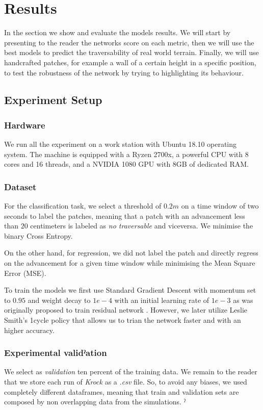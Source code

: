 \documentclass[../document.tex]{subfiles}
\begin{document}
\section{Results}
In the section we show and evaluate the models results. We will start by presenting to the reader the networks score on each metric, then we will use the best models to predict the traversability of real world terrain. Finally, we will use handcrafted patches, for example a wall of a certain height in a specific position, to test the robustness of the network by trying to highlighting its behaviour.
\subsection{Experiment Setup}
\subsubsection{Hardware}
We run all the experiment on a work station with Ubuntu 18.10 operating system. The machine is equipped with a Ryzen 2700x, a powerful CPU with 8 cores and 16 threads, and a NVIDIA 1080 GPU with 8GB of dedicated RAM.
\subsubsection{Dataset}
For the classification task, we select a threshold of $0.2m$ on a time window of two seconds to label the patches, meaning that a patch with an advancement less than $20$ centimeters is labeled as \emph{no traversable} and viceversa. We minimise the binary Cross Entropy. 

On the other hand, for regression, we did not label the patch and directly regress on the advancement for a given time window while minimising the Mean Square Error (MSE). 

To train the models we first use Standard Gradient Descent with momentum set to $0.95$ and weight decay to $1e-4$ with an initial learning rate of $1e-3$ as was originally proposed to train residual network \cite{he2015deep}. However, we later utilize Leslie Smith's 1cycle policy \cite{1cycle} that allows us to trian the network faster and with an higher accuracy.
\subsubsection{Experimental validˀation}
We select as \emph{validation} ten percent of the training data. We remain to the reader that we store each run of \emph{Krock} as a \emph{.csv} file. So, to avoid any biases, we used completely different dataframes, meaning that train and validation sets are composed by non overlapping data from the simulations.
ˀ
\end{document}
